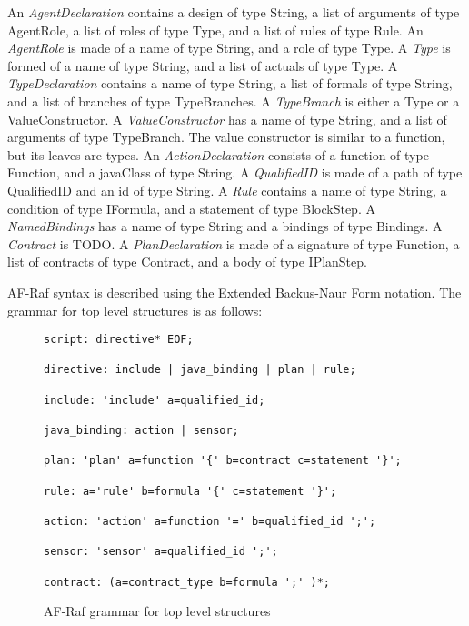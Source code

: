 \documentclass[a4paper,12pt,oneside,fleqn]{book} %
\theoremstyle{plain}
\theoremstyle{definition}
\theoremstyle{remark}
\begin{document}
An \textit{AgentDeclaration} contains a design of type String, a list of
arguments of type AgentRole, a list of roles of type Type, and a list of
rules of type Rule. An \textit{AgentRole} is made of a name of type String,
and a role of type Type. A \textit{Type} is formed of a name of type
String, and a list of actuals of type Type. A \textit{TypeDeclaration}
contains a name of type String, a list of formals of type String, and a
list of branches of type TypeBranches. A \textit{TypeBranch} is either a
Type or a ValueConstructor. A \textit{ValueConstructor} has a name of type
String, and a list of arguments of type TypeBranch. The value constructor
is similar to a function, but its leaves are types. An
\textit{ActionDeclaration} consists of a function of type Function, and a
javaClass of type String. A \textit{QualifiedID} is made of a path of type
QualifiedID and an id of type String. A \textit{Rule} contains a name of
type String, a condition of type IFormula, and a statement of type
BlockStep. A \textit{NamedBindings} has a name of type String and a
bindings of type Bindings. A \textit{Contract} is TODO. A
\textit{PlanDeclaration} is made of a signature of type Function, a list of
contracts of type Contract, and a body of type IPlanStep.


AF-Raf syntax is described using the Extended Backus-Naur Form notation.
The grammar for top level structures is as follows:

\begin{figure}\footnotesize %
\begin{verbatim}
script: directive* EOF;

directive: include | java_binding | plan | rule;

include: 'include' a=qualified_id;

java_binding: action | sensor;

plan: 'plan' a=function '{' b=contract c=statement '}';

rule: a='rule' b=formula '{' c=statement '}';

action: 'action' a=function '=' b=qualified_id ';';

sensor: 'sensor' a=qualified_id ';';

contract: (a=contract_type b=formula ';' )*;

\end{verbatim}
\caption{AF-Raf grammar for top level structures}
\label{fig:grammar-top-level}
\end{figure} %
\end{document}

